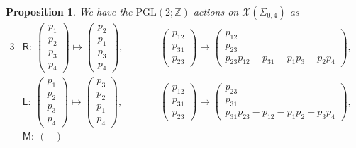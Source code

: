 \documentclass[pdftex]{sigma}
\numberwithin{equation}{section}
\newtheorem{Proposition}[Theorem]{Proposition}
 { \theoremstyle{definition}
\newtheorem{Definition}[Theorem]{Definition}
\newtheorem{Note}[Theorem]{Note}
\newtheorem{Example}[Theorem]{Example}
\newtheorem{Remark}[Theorem]{Remark} }
\begin{document}
\begin{Proposition} We have the $\mathrm{PGL}(2;\mathbb{Z})$ actions on $\mathcal{X}(\Sigma_{0,4})$ as
 \begin{alignat*}{3}
 & \mathsf{R} \colon \ \left( \begin{matrix}
 {p}_1 \\
 {p}_2 \\
 {p}_3 \\
 {p}_4
 \end{matrix} \right) \mapsto \left( \begin{matrix}
 {p}_2 \\
 {p}_1 \\
 {p}_3 \\
 {p}_4
 \end{matrix}
 \right),
 \qquad &&
 \left( \begin{matrix}
 p_{12} \\
 p_{31} \\
 p_{23}
 \end{matrix}
 \right)
 \mapsto
 \left( \begin{matrix}
 p_{12} \\
 p_{23} \\
 p_{23} p_{12} - p_{31} - p_1 p_3 - p_2 p_4
 \end{matrix} \right) ,& \\
 & \mathsf{L}\colon \ \left( \begin{matrix}
 {p}_1 \\
 {p}_2 \\
 {p}_3 \\
 {p}_4
 \end{matrix}
 \right)
 \mapsto
 \left( \begin{matrix}
 {p}_3 \\
 {p}_2 \\
 {p}_1 \\
 {p}_4
 \end{matrix}
 \right),
 \qquad &&
 \left( \begin{matrix}
 p_{12} \\
 p_{31} \\
 p_{23}
 \end{matrix}
 \right)
 \mapsto \left( \begin{matrix}
 p_{23} \\
 p_{31} \\
 p_{31} p_{23} - p_{12} - p_1 p_2 - p_3 p_4
 \end{matrix}
 \right) , & \\
 & \mathsf{M} \colon \
 \begin{pmatrix}

\end{pmatrix}
\end{alignat*}
\end{Proposition}
\end{document}
